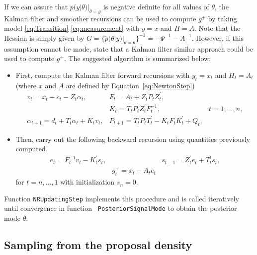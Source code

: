 \documentclass{article}
\begin{document}
If we can assure that $\ddot{p}(y|\theta)|_{\theta=g} $ is negative definite for all values
of $\theta$, the Kalman filter and smoother recursions can be used to compute $g^+$ by taking
model \eqref{eq:Transition}-\eqref{eq:measurement} with $y=x$ and $H=A$. Note that the
Hessian is simply given by
$ G= \{\ddot{p}(\theta|y)|_{\theta=\hat{\theta}} \}^{-1} = -\Psi^{-1} - A^{-1}$. However, if
this assumption cannot be made, \citet[Theorem~1]{jungbacker2007monte} state that a Kalman
filter similar approach could be used to compute $g^+$. The suggested algorithm is summarized
below:
\begin{itemize}
\item First, compute the Kalman filter forward recursions with $y_t=x_t $ and $H_t=A_t$
  (where $x$ and $A$ are defined by Equation~\eqref{eq:NewtonStep})
  \begin{equation}
  \begin{array}{rcl}
    v_t = x_t - c_t - Z_t \alpha_t, &  F_t = A_t + Z_t P_t Z_t^{\prime}, & \\
     & K_t=T_t P_t Z_t^{\prime} F_t^{-1}, & t=1,\dots,n, \\
     \alpha_{t+1}=d_t + T_t \alpha_t + K_t v_t, & P_{t+1}=T_t P_t T_t^{\prime}-K_t F_t K_t^{\prime}+ Q_t,
  \end{array}
  \label{eq:KFForward}
\end{equation}

\item Then, carry out the following backward recursion using quantities previously computed.
   \begin{equation}
  \begin{array}{rcl}
    e_t = F_t^{-1} v_t - K_t^{\prime} s_t, &  & s_{t-1} = Z_t^{\prime} e_t + T_t^{\prime}s_t, \\
     &  g_t^+ = x_t -A_t e_t  &
  \end{array}
  \label{eq:KFBackward}
\end{equation}
for $t=n,\dots,1$ with initialization $s_n=0$.
\end{itemize}

Function \texttt{NRUpdatingStep} implements this procedure and is called iteratively until
convergence in function \texttt{ PosteriorSignalMode} to obtain the posterior mode
$\hat{\theta}$.

\subsection{Sampling from the proposal density}
\label{sec:SamplingNonLin}
\end{document}
